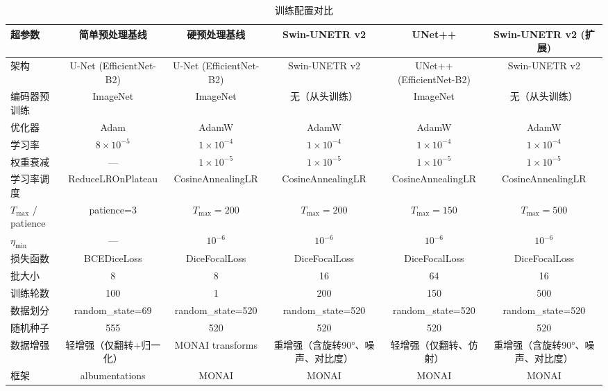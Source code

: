 \documentclass[12pt, a4paper]{article}
\begin{document}
\begin{table}[H]
    \centering
    \caption{训练配置对比}
    \label{tab:train_config}
    \begin{adjustbox}{max width=\textwidth}
    \begin{tabular}{@{}lccccc@{}}
        \toprule
        \textbf{超参数} & \textbf{简单预处理基线} & \textbf{硬预处理基线} & \textbf{Swin-UNETR v2} & \textbf{UNet++} & \textbf{Swin-UNETR v2 (扩展)} \\
        \midrule
        架构 & U-Net (EfficientNet-B2) & U-Net (EfficientNet-B2) & Swin-UNETR v2 & UNet++ (EfficientNet-B2) & Swin-UNETR v2 \\
        编码器预训练 & ImageNet & ImageNet & 无（从头训练） & ImageNet & 无（从头训练） \\
        优化器 & Adam & AdamW \cite{loshchilov2017decoupled} & AdamW \cite{loshchilov2017decoupled} & AdamW \cite{loshchilov2017decoupled} & AdamW \cite{loshchilov2017decoupled} \\
        学习率 & $8{\times}10^{-5}$ & $1{\times}10^{-4}$ & $1{\times}10^{-4}$ & $1{\times}10^{-4}$ & $1{\times}10^{-4}$ \\
        权重衰减 & --- & $1{\times}10^{-5}$ & $1{\times}10^{-5}$ & $1{\times}10^{-5}$ & $1{\times}10^{-5}$ \\
        学习率调度 & ReduceLROnPlateau & CosineAnnealingLR & CosineAnnealingLR & CosineAnnealingLR & CosineAnnealingLR \\
        $T_{\max}$ / patience & patience=3 & $T_{\max}=200$ & $T_{\max}=200$ & $T_{\max}=150$ & $T_{\max}=500$ \\
        $\eta_{\min}$ & --- & $10^{-6}$ & $10^{-6}$ & $10^{-6}$ & $10^{-6}$ \\
        损失函数 & BCEDiceLoss & DiceFocalLoss & DiceFocalLoss & DiceFocalLoss & DiceFocalLoss \\
        批大小 & 8 & 8 & 16 & 64 & 16 \\
        训练轮数 & 100 & 1 & 200 & 150 & 500 \\
        数据划分 & random\_state=69 & random\_state=520 & random\_state=520 & random\_state=520 & random\_state=520 \\
        随机种子 & 555 & 520 & 520 & 520 & 520 \\
        数据增强 & 轻增强（仅翻转+归一化） & MONAI transforms & 重增强（含旋转90°、噪声、对比度） & 轻增强（仅翻转、仿射） & 重增强（含旋转90°、噪声、对比度） \\
        框架 & albumentations & MONAI & MONAI & MONAI & MONAI \\
        \bottomrule
    \end{tabular}
    \end{adjustbox}
\end{table}
\end{document}
